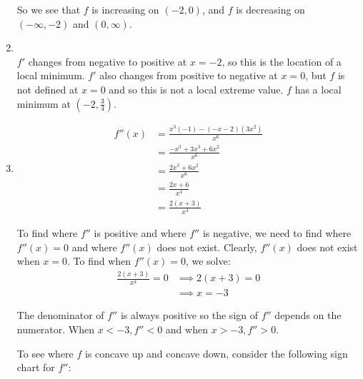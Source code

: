 \documentclass[nooutcomes]{ximera}
\begin{document}
\begin{problem}
\begin{freeResponse}
\begin{enumerate}
       So we see that $f$ is increasing on $(-2,0)$, and $f$ is decreasing on $(-\infty, -2)$ and $(0,\infty)$.
       
     \item
         \\
       $f'$ changes from negative to positive at $x=-2$, so this is the location of a local minimum.
       $f'$ also changes from positive to negative at $x=0$, but $f$ is not defined at $x=0$ and so this is not a local extreme value.
       $f$ has a local minimum at $\left( -2,\frac{3}{4} \right)$.
			
			
			
     \item
       \begin{align*}
         f''(x) &= \frac{x^3(-1) - (-x-2)(3x^2)}{x^6} \\
                &= \frac{-x^3 + 3x^3 + 6x^2}{x^6} \\
		&= \frac{2x^3 + 6x^2}{x^6} \\
		&= \frac{2x+6}{x^4} \\
		&= \frac{2(x+3)}{x^4}
       \end{align*}
			
       To find where $f''$ is positive and where $f''$ is negative, we need to find where $f''(x) = 0$ and where $f''(x)$ does not exist.
       Clearly, $f''(x)$ does not exist when $x=0$.
       To find when $f''(x) = 0$, we solve:
       \begin{align*}
         \frac{2(x+3)}{x^4} = 0 &\implies 2(x+3) = 0\\
         &\implies x=-3
       \end{align*}

	The denominator of $f''$ is always positive so the sign of $f''$ depends on the numerator.  When $x<-3, f''<0$ and when $x>-3, f''>0$.		
									
       To see where $f$ is concave up and concave down, consider the following sign chart for $f''$:
       \begin{center}
         \begin{image}
         \end{image}
       \end{center}


\end{enumerate}
\end{freeResponse}
\end{problem}
\end{document}
